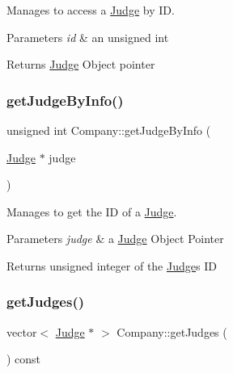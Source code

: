 Manages to access a \hyperlink{class_judge}{Judge} by ID. 


\begin{DoxyParams}{Parameters}
{\em id} & an unsigned int \\
\hline
\end{DoxyParams}
\begin{DoxyReturn}{Returns}
\hyperlink{class_judge}{Judge} Object pointer 
\end{DoxyReturn}
\mbox{\label{class_company_a0ea843e026af967b2d4d69d268481cb7}} 
\subsubsection{\texorpdfstring{get\+Judge\+By\+Info()}{getJudgeByInfo()}}
{\footnotesize\ttfamily unsigned int Company\+::get\+Judge\+By\+Info (\begin{DoxyParamCaption}\item[{\hyperlink{class_judge}{Judge} $\ast$}]{judge }\end{DoxyParamCaption})}



Manages to get the ID of a \hyperlink{class_judge}{Judge}. 


\begin{DoxyParams}{Parameters}
{\em judge} & a \hyperlink{class_judge}{Judge} Object Pointer \\
\hline
\end{DoxyParams}
\begin{DoxyReturn}{Returns}
unsigned integer of the \hyperlink{class_judge}{Judge}\textquotesingle{}s ID 
\end{DoxyReturn}
\mbox{\label{class_company_a287cc3acf891e584e630eced10eba45a}} 
\subsubsection{\texorpdfstring{get\+Judges()}{getJudges()}}
{\footnotesize\ttfamily vector$<$ \hyperlink{class_judge}{Judge} $\ast$ $>$ Company\+::get\+Judges (\begin{DoxyParamCaption}{ }\end{DoxyParamCaption}) const}



